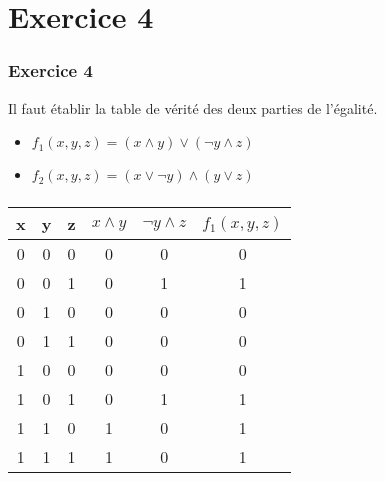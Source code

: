 \documentclass[svgnames,11pt]{beamer}
\begin{document}
\section{Exercice 4}
\begin{frame}
    \frametitle{Exercice 4}
    Il faut établir la table de vérité des deux parties de l'égalité.

    \begin{itemize}
        \item $f_1(x,y,z)=(x\land y)\lor (\lnot y \land z)$
        \item $f_2(x,y,z)=(x \lor \lnot y)\land (y \lor z)$
    \end{itemize}
\end{frame}
\begin{frame}
    \frametitle{}

    \begin{center}
        \begin{tabular}{|*6{c|}}
            \hline
            x & y & z & $x\land y$ & $\lnot y \land z$ & $f_1(x,y,z)$ \\
            \hline
            0 & 0 & 0 & 0          & 0                 & 0            \\
            \hline
            0 & 0 & 1 & 0          & 1                 & 1            \\
            \hline
            0 & 1 & 0 & 0          & 0                 & 0            \\
            \hline
            0 & 1 & 1 & 0          & 0                 & 0            \\
            \hline
            1 & 0 & 0 & 0          & 0                 & 0            \\
            \hline
            1 & 0 & 1 & 0          & 1                 & 1            \\
            \hline
            1 & 1 & 0 & 1          & 0                 & 1            \\
            \hline
            1 & 1 & 1 & 1          & 0                 & 1            \\
            \hline
        \end{tabular}
    \end{center}

\end{frame}
\end{document}
